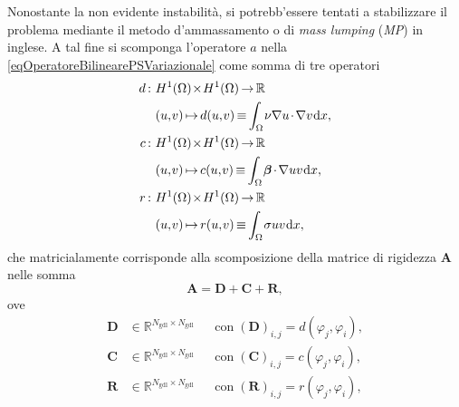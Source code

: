 \documentclass{article}
\newcommand{\de}{\mathrm{d}}
\newcommand{\Ngdl}{N_{\text{gdl}}}
\begin{document}
                Nonostante la non evidente instabilità, si potrebb'essere tentati a stabilizzare il problema mediante il metodo d'ammassamento o di \textit{mass lumping} (\textit{MP}) in inglese. A tal fine si scomponga l'operatore $a$ nella \eqref{eqOperatoreBilinearePSVariazionale} come somma di tre operatori
                \begin{equation*}
                    \setlength{\thinmuskip}{1mu}
                    \setlength{\medmuskip}{2mu}
                    \setlength{\thickmuskip}{3mu}
                    \begin{aligned}
                        d:\ &H^1(\Omega)\!\times\!H^1(\Omega)
                        \rightarrow\mathbb R\\
                        &(u,v)\mapsto d(u,v)\equiv
                        \int_{\Omega}\nu\nabla u\cdot\nabla v\,\de x,\\
                        c:\ &H^1(\Omega)\!\times\!H^1(\Omega)
                        \rightarrow\mathbb R\\
                        &(u,v)\mapsto c(u,v)\equiv
                        \int_{\Omega}\boldsymbol\beta\cdot\nabla uv\,\de x,\\
                        r:\ &H^1(\Omega)\!\times\!H^1(\Omega)
                        \rightarrow\mathbb R\\
                        &(u,v)\mapsto r(u,v)\equiv
                        \int_{\Omega}\sigma uv \,\de x,
                    \end{aligned}
                    \label{eqOperatoriBilineariPVAmmassamento}
                \end{equation*}
                che matricialamente corrisponde alla scomposizione della matrice di rigidezza $\mathbf A$ nelle somma
                \begin{equation}
                    \mathbf A=\mathbf D+\mathbf C+\mathbf R,
                    \label{eqScomposizioneMatriceRigidezza}
                \end{equation}
                ove
                \begin{equation*}
                    \begin{aligned}
                        \mathbf D&\in\mathbb R^{\Ngdl\times\Ngdl}
                        &&\text{con}\;(\mathbf D)_{i,j}=d(\varphi_j,\varphi_i),\\
                        \mathbf C&\in\mathbb R^{\Ngdl\times\Ngdl}
                        &&\text{con}\;(\mathbf C)_{i,j}=c(\varphi_j,\varphi_i),\\
                        \mathbf R&\in\mathbb R^{\Ngdl\times\Ngdl}
                        &&\text{con}\;(\mathbf R)_{i,j}=r(\varphi_j,\varphi_i),\\
                    \end{aligned}
                    \label{eqScomposizioneADefinizioneMatrici}
                \end{equation*}
\end{document}
